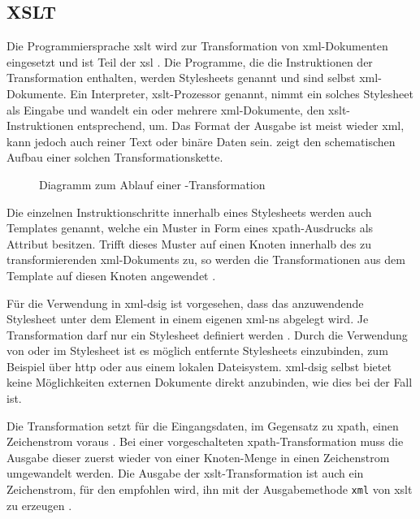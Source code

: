 \subsection{XSLT}
\label{sec:XML-DSig:Transformationen:XSLT}
Die Programmiersprache \gls{xslt} wird zur Transformation von \gls{xml}-Dokumenten eingesetzt und ist Teil der \gls{xsl} \cite{xml:oreilly}. Die Programme, die
die Instruktionen der Transformation enthalten, werden Stylesheets genannt und sind selbst \gls{xml}-Dokumente. Ein Interpreter, \gls{xslt}-Prozessor genannt,
nimmt ein solches Stylesheet als Eingabe und wandelt ein oder mehrere \gls{xml}-Dokumente, den \gls{xslt}-Instruktionen entsprechend, um. Das Format der Ausgabe ist
meist wieder \gls{xml}, kann jedoch auch reiner Text oder binäre Daten sein.  zeigt den schematischen Aufbau einer solchen
Transformationskette.

\begin{figure}
    \centering
    
    \caption{Diagramm zum Ablauf einer \texorpdfstring{\protect{}}{XSLT}-Transformation}
    \label{fig:xslt-processing}
\end{figure}

Die einzelnen Instruktionschritte innerhalb eines Stylesheets werden auch Templates genannt, welche ein Muster in Form eines \gls{xpath}-Ausdrucks als Attribut besitzen. 
Trifft dieses Muster auf einen Knoten innerhalb des zu transformierenden \gls{xml}-Dokuments zu, so werden die Transformationen  aus dem Template auf diesen Knoten 
angewendet \cite{xslt:w3c,xml:oreilly}.

Für die Verwendung in \gls{xml-dsig} ist vorgesehen, dass das anzuwendende Stylesheet unter dem Element  in einem eigenen \gls{xml-ns} abgelegt wird.
Je Transformation darf nur ein Stylesheet definiert werden \cite{xml-dsig:w3c}. Durch die Verwendung von  oder  im
Stylesheet ist es möglich entfernte Stylesheets einzubinden, zum Beispiel über \gls{http} oder aus einem lokalen Dateisystem. \gls{xml-dsig} selbst bietet keine
Möglichkeiten externen Dokumente direkt anzubinden, wie dies bei  der Fall ist. 

Die Transformation setzt für die Eingangsdaten, im Gegensatz zu \gls{xpath}, einen Zeichenstrom voraus \cite{xml-dsig:w3c}. Bei einer vorgeschalteten
\gls{xpath}-Transformation muss die Ausgabe dieser zuerst wieder von einer Knoten-Menge in einen Zeichenstrom umgewandelt werden. Die Ausgabe der
\gls{xslt}-Transformation ist auch ein Zeichenstrom, für den empfohlen wird, ihn mit der Ausgabemethode \texttt{xml} von \gls{xslt} zu erzeugen \cite{xml-dsig:w3c}.

